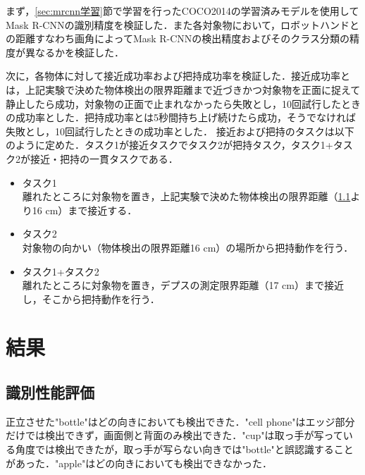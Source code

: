 まず，\ref{sec:mrcnn学習}節で学習を行ったCOCO2014の学習済みモデルを使用してMask R-CNNの識別精度を検証した．また各対象物において，ロボットハンドとの距離すなわち画角によってMask R-CNNの検出精度およびそのクラス分類の精度が異なるかを検証した．

次に，各物体に対して接近成功率および把持成功率を検証した．接近成功率とは，上記実験で決めた物体検出の限界距離まで近づきかつ対象物を正面に捉えて静止したら成功，対象物の正面で止まれなかったら失敗とし，10回試行したときの成功率とした．把持成功率とは5秒間持ち上げ続けたら成功，そうでなければ失敗とし，10回試行したときの成功率とした．
接近および把持のタスクは以下のように定めた．タスク1が接近タスクでタスク2が把持タスク，タスク1+タスク2が接近・把持の一貫タスクである．
\begin{itemize}
    \item タスク1\\
    離れたところに対象物を置き，上記実験で決めた物体検出の限界距離（\ref{sec:識別性能評価}より16 cm）まで接近する．
    \item タスク2\\
    対象物の向かい（物体検出の限界距離16 cm）の場所から把持動作を行う．
    \item タスク1+タスク2\\
    離れたところに対象物を置き，デプスの測定限界距離（17 cm）まで接近し，そこから把持動作を行う．
\end{itemize}


\section{結果}
\subsection{識別性能評価}\label{sec:識別性能評価}
正立させた"bottle"はどの向きにおいても検出できた．"cell phone"はエッジ部分だけでは検出できず，画面側と背面のみ検出できた．"cup"は取っ手が写っている角度では検出できたが，取っ手が写らない向きでは"bottle"と誤認識することがあった．"apple"はどの向きにおいても検出できなかった．

